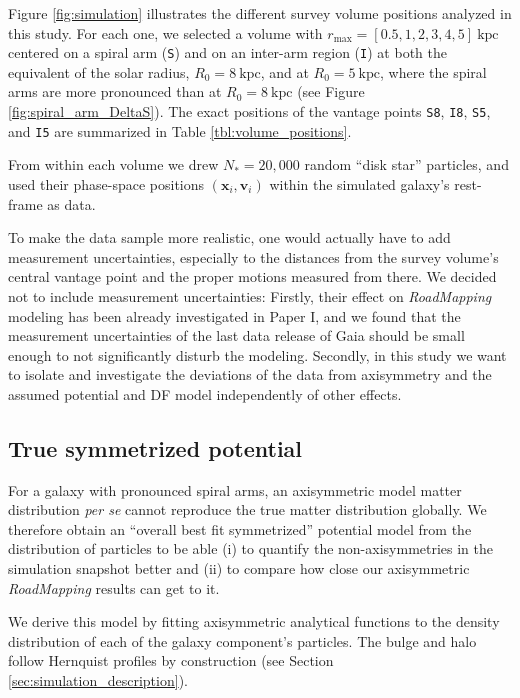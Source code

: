 \documentclass[iop,revtex4,numberedappendix,appendixfloats]{emulateapj}
\newcommand{\vect}[1]{\boldsymbol{#1}}
\newcommand{\RM}{{\sl RoadMapping}}
\begin{document}
Figure \ref{fig:simulation} illustrates the different survey volume positions analyzed in this study. For each one, we selected a volume with $r_\text{max}=[0.5,1,2,3,4,5]~\text{kpc}$ centered on a spiral arm (\texttt{S}) and on an inter-arm region (\texttt{I}) at both the equivalent of the solar radius, $R_0=8~\text{kpc}$, and at $R_0=5~\text{kpc}$, where the spiral arms are more pronounced than at $R_0=8~\text{kpc}$ (see Figure \ref{fig:spiral_arm_DeltaS}). The exact positions of the vantage points \texttt{S8}, \texttt{I8}, \texttt{S5}, and \texttt{I5} are summarized in Table \ref{tbl:volume_positions}.

From within each volume we drew $N_*=20,000$ random ``disk star'' particles, and used their phase-space positions $(\vect{x}_i,\vect{v}_i)$ within the simulated galaxy's rest-frame as data. 

To make the data sample more realistic, one would actually have to add measurement uncertainties, especially to the distances from the survey volume's central vantage point and the proper motions measured from there. We decided not to include measurement uncertainties: Firstly, their effect on \RM{} modeling has been already investigated in Paper I, and we found that the measurement uncertainties of the last data release of Gaia should be small enough to not significantly disturb the modeling. Secondly, in this study we want to isolate and investigate the deviations of the data from axisymmetry and the assumed potential and DF model independently of other effects.

\subsection{True symmetrized potential} \label{sec:DEHH-Pot}

For a galaxy with pronounced spiral arms, an axisymmetric model matter distribution \emph{per se} cannot reproduce the true matter distribution globally. We therefore obtain an ``overall best fit symmetrized'' potential model from the distribution of particles to be able (i) to quantify the non-axisymmetries in the simulation snapshot better and (ii) to compare how close our axisymmetric \RM{} results can get to it. 

We derive this model by fitting axisymmetric analytical functions to the density distribution of each of the galaxy component's particles. The bulge and halo follow Hernquist profiles by construction (see Section \ref{sec:simulation_description}).
\end{document}
